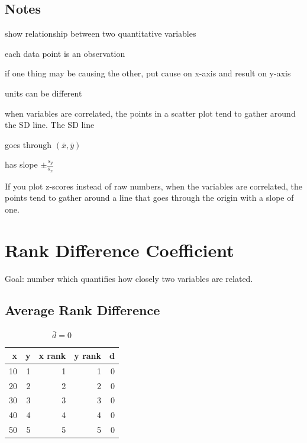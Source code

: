 \documentclass[landscape]{exam}
\begin{document}
  \subsection{Notes}
  \begin{itemize*}
    \item show relationship between two quantitative variables
    \item each data point is an observation
    \item if one thing may be causing the other, put cause on x-axis and
      result on y-axis
    \item units can be different
    \item when variables are correlated, the points in a scatter plot tend to
      gather around the SD line.  The SD line 
      \begin{itemize*}
        \item goes through $(\bar{x}, \bar{y})$
        \item has slope $\pm \frac{s_y}{s_x}$
      \end{itemize*}

    \item If you plot z-scores instead of raw numbers, when the variables are
      correlated, the points tend to gather around a line that goes through the
      origin with a slope of one.

  \end{itemize*}


  \section{Rank Difference Coefficient} %

  Goal: number which quantifies how closely two variables are related.

  \subsection{Average Rank Difference} %

  \begin{table}[H]
    \centering
    \begin{tabular}{rrrrr}
      \toprule
      x  & y & x rank & y rank & d \\
      \midrule
      10 & 1 & 1      & 1      & 0 \\
      20 & 2 & 2      & 2      & 0 \\
      30 & 3 & 3      & 3      & 0 \\
      40 & 4 & 4      & 4      & 0 \\
      50 & 5 & 5      & 5      & 0 \\
      \bottomrule
    \end{tabular}
    \caption{$\bar{d} = 0$}
  \end{table}
\end{document}
